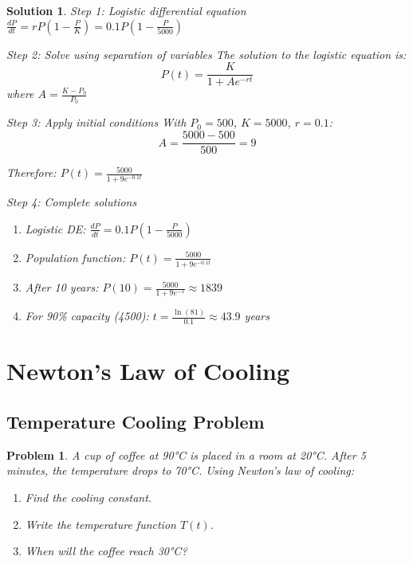 \documentclass[12pt, letterpaper]{book}
\newcounter{problemcounter}[chapter]
\theoremstyle{problemstyle}
\newtheorem{problem}[problemcounter]{Problem}
\theoremstyle{solutionstyle}
\newtheorem*{solution}{Solution}
\begin{document}
\begin{solution}
\textit{Step 1: Logistic differential equation}
$\frac{dP}{dt} = rP\left(1-\frac{P}{K}\right) = 0.1P\left(1-\frac{P}{5000}\right)$

\textit{Step 2: Solve using separation of variables}
The solution to the logistic equation is:
$$P(t) = \frac{K}{1 + Ae^{-rt}}$$
where $A = \frac{K-P_0}{P_0}$

\textit{Step 3: Apply initial conditions}
With $P_0 = 500$, $K = 5000$, $r = 0.1$:
$$A = \frac{5000-500}{500} = 9$$

Therefore: $P(t) = \frac{5000}{1 + 9e^{-0.1t}}$

\textit{Step 4: Complete solutions}
\begin{enumerate}
    \item Logistic DE: $\frac{dP}{dt} = 0.1P\left(1-\frac{P}{5000}\right)$
    \item Population function: $P(t) = \frac{5000}{1 + 9e^{-0.1t}}$
    \item After 10 years: $P(10) = \frac{5000}{1 + 9e^{-1}} \approx 1839$
    \item For 90\% capacity (4500): $t = \frac{\ln(81)}{0.1} \approx 43.9$ years
\end{enumerate}
\end{solution}

\section{Newton's Law of Cooling}

\subsection{Temperature Cooling Problem}

\begin{problem}
A cup of coffee at 90°C is placed in a room at 20°C. After 5 minutes, the temperature drops to 70°C. Using Newton's law of cooling:
\begin{enumerate}
    \item Find the cooling constant.
    \item Write the temperature function $T(t)$.
    \item When will the coffee reach 30°C?
\end{enumerate}
\end{problem}
\end{document}
